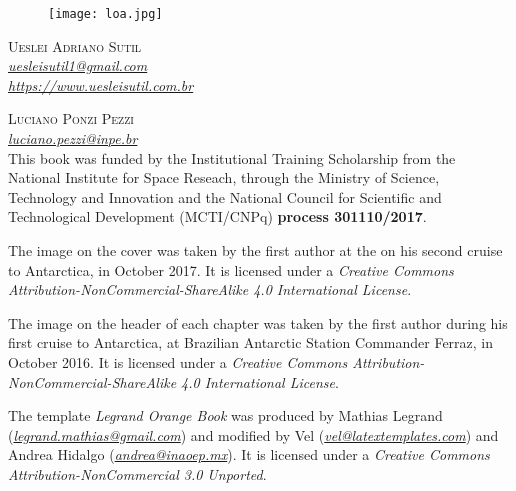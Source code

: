 \newpage
\thispagestyle{empty}

\begin{figure}[H]
    \centering
    \vspace*{\fill}
    \texttt{[image: loa.jpg]}
    \vspace{0.5cm}
\end{figure}

\noindent \textsc{Ueslei Adriano Sutil} 
\\
\noindent \textcolor{bleu_cite}{\href{mailto:uesleisutil1@gmail.com}{\textit{uesleisutil1@gmail.com}}}
\\  %
\noindent \textcolor{bleu_cite}{\href{https://www.uesleisutil.com.br}{\textit{https://www.uesleisutil.com.br}}}
\bigskip

\noindent \textsc{Luciano Ponzi Pezzi}
\\
\noindent \textcolor{bleu_cite}{\href{mailto:luciano.pezzi@inpe.br}{\textit{luciano.pezzi@inpe.br}}}  %
\bigskip
\\

\noindent This book was funded by the Institutional Training Scholarship from the National Institute for Space Reseach, through the Ministry of Science, Technology and Innovation and the National 
Council for Scientific and Technological Development (MCTI/CNPq) \textbf{process 301110/2017}.
\bigskip

\noindent The image on the cover was taken by the first author at the on his second cruise to Antarctica,
          in October 2017. It is licensed under a \textit{Creative Commons Attribution-NonCommercial-ShareAlike 4.0 International License}. 
\bigskip

\noindent The image on the header of each chapter was taken by the first author during his first cruise to Antarctica, at Brazilian Antarctic Station Commander Ferraz, in October 2016. 
          It is licensed under a \textit{Creative Commons Attribution-NonCommercial-ShareAlike 4.0 International License}. 
\bigskip

\noindent The template \textit{Legrand Orange Book} was produced by Mathias Legrand (\textcolor{bleu_cite}{\href{mailto:legrand.mathias@gmail.com}{\textit{legrand.mathias@gmail.com}}}) 
          and modified by Vel (\textcolor{bleu_cite}{\href{mailto:vel@latextemplates.com}{\textit{vel@latextemplates.com}}}) and Andrea Hidalgo (\textcolor{bleu_cite}{\href{mailto:andrea@inaoep.mx}{\textit{andrea@inaoep.mx}}}). 
          It is licensed under a \textit{Creative Commons Attribution-NonCommercial 3.0 Unported}.
\bigskip

